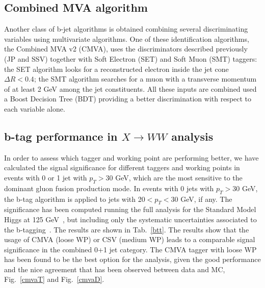 \subsection*{Combined MVA algorithm}
Another class of   b-jet  algorithms is obtained combining several discriminating variables using multivariate algorithms.
One of these  identification algorithms, the  Combined MVA v2 (CMVA), uses the discriminators described previously (JP and SSV) together with 
 Soft Electron (SET) and Soft Muon (SMT) taggers:
the SET algorithm looks for a reconstructed electron inside the jet cone $\Delta R<0.4$;
the SMT algorithm searches for a muon with a transverse momentum of at least 2 GeV among the jet constituents. 
All these inputs are combined used a Boost Decision Tree (BDT) providing a better discrimination with respect to each variable alone.


\subsection*{b-tag performance in $X \to WW$ analysis}
In order to assess which tagger and working point are performing better, we have calculated
the signal significance for different taggers and working points in events with 0 or 1 jet with $p_T>$30  GeV, 
which are the most sensitive to the dominant gluon fusion production mode. In events with 0 jets with $p_T>$30  GeV, the b-tag algorithm is applied to jets with 20$< p_T <$30 GeV, if any. The significance
has been computed running the full analysis for the Standard Model Higgs at 125 GeV~\cite{CMS-PAS-HIG-16-042},  but including only the systematic uncertainties
associated to the b-tagging~\cite{Chatrchyan:2012jua}. The results are shown in Tab.~\ref{btt}.
The results show that the usage of CMVA (loose WP) or  CSV (medium WP) leads to a
comparable signal significance in the combined 0+1 jet category. The CMVA tagger with loose
WP has been found to be the best option for the analysis, given the good performance and the
nice agreement that has been observed between data and MC, Fig.~\ref{cmvaT} and  Fig.~\ref{cmvaD}.

